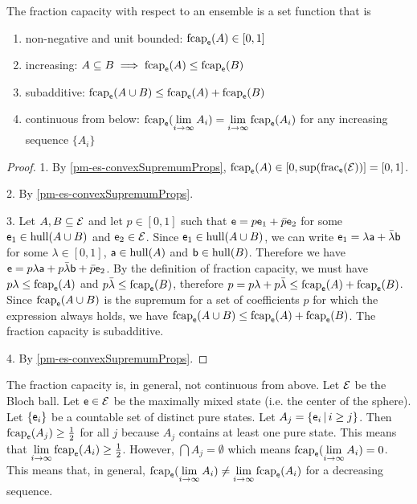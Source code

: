 \begin{mathSection}
	\begin{prop}
		The fraction capacity with respect to an ensemble is a set function that is
		\begin{enumerate}
			\item non-negative and unit bounded: $\fcap_{\ens}(A) \in [0,1]$
			\item increasing: $A \subseteq B \implies \fcap_{\ens}(A) \leq \fcap_{\ens}(B)$
			\item subadditive: $\fcap_{\ens}(A \cup B) \leq \fcap_{\ens}(A) + \fcap_{\ens}(B)$
			\item continuous from below: $\fcap_{\ens}(\lim\limits_{i \to \infty} A_i) = \lim\limits_{i \to \infty} \fcap_{\ens}(A_i)$ for any increasing sequence $\{A_i\}$
		\end{enumerate}
	\end{prop}
	
	\begin{proof}
		1. By \ref{pm-es-convexSupremumProps}, $\fcap_{\ens}(A) \in [0, \sup(\fraction_{\ens}(\Ens))] = [0,1]$. 
	
		2. By \ref{pm-es-convexSupremumProps}.
		
		3. Let $A, B \subseteq \Ens$ and let $p \in [0,1]$ such that $\ens = p \ens_1 + \bar{p} \ens_2$ for some $\ens_1 \in \hull(A \cup B)$ and $\ens_2 \in \Ens$. Since $\ens_1 \in \hull(A \cup B)$, we can write $\ens_1 = \lambda \ens[a] + \bar{\lambda} \ens[b]$ for some $\lambda \in [0,1]$, $\ens[a] \in \hull(A)$ and $\ens[b] \in \hull(B)$. Therefore we have $\ens = p \lambda \ens[a] + p \bar{\lambda} \ens[b] + \bar{p} \ens_2$. By the definition of fraction capacity, we must have $p\lambda \leq \fcap_{\ens}(A)$ and $p\bar{\lambda} \leq \fcap_{\ens}(B)$, therefore $p = p\lambda + p\bar{\lambda} \leq \fcap_{\ens}(A) + \fcap_{\ens}(B)$. 	Since $\fcap_{\ens}(A \cup B)$ is the supremum for a set of coefficients $p$ for which the expression always holds, we have $\fcap_{\ens}(A \cup B) \leq \fcap_{\ens}(A) + \fcap_{\ens}(B)$. The fraction capacity is subadditive.
	
		4. By \ref{pm-es-convexSupremumProps}.
	\end{proof}
	

\begin{remark}
	The fraction capacity is, in general, not continuous from above. Let $\Ens$ be the Bloch ball. Let $\ens \in \Ens$ be the maximally mixed state (i.e. the center of the sphere). Let $\{\ens_i\}$ be a countable set of distinct pure states. Let $A_j = \{ \ens_i \, | \, i \geq j\}$. Then $\fcap_{\ens}(A_j) \geq \frac{1}{2}$ for all $j$ because $A_j$ contains at least one pure state. This means that $\lim\limits_{i \to \infty} \fcap_{\ens}(A_i) \geq \frac{1}{2}$. However, $\bigcap A_j = \emptyset$ which means $\fcap_{\ens}(\lim\limits_{i \to \infty} A_i) = 0$. This means that, in general, $\fcap_{\ens}(\lim\limits_{i \to \infty} A_i) \neq \lim\limits_{i \to \infty} \fcap_{\ens}(A_i)$ for a decreasing sequence.
\end{remark}


\end{mathSection}
